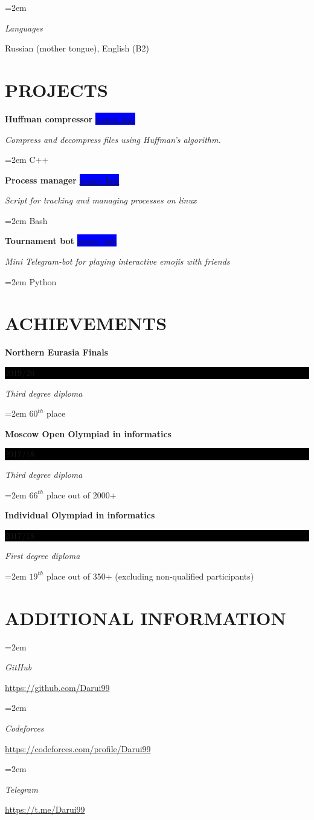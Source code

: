 \documentclass[paper=a4,fontsize=11pt]{scrartcl} %
\newlength{\spacebox}
\newcommand{\sepspace}{\vspace*{1em}}		%
\newcommand{\NewPart}[1]{\section*{\uppercase{#1}}}
\newcommand{\PersonalEntry}[2]{
		\noindent\hangindent=2em\hangafter=0 %
		\parbox{\spacebox}{        %
		\textit{#1}}		       %
		\hspace{1.5em} #2 \par}    %
\newcommand{\SkillsEntry}[2]{      %
		\noindent\hangindent=2em\hangafter=0 %
		\parbox{\spacebox}{        %
		\textit{#1}}			   %
		\hspace{1.5em} #2 \par}    %
\newcommand{\EducationEntry}[4]{
		\noindent \textbf{#1} \hfill      %
		\colorbox{Black}{%
			\parbox{6em}{%
			\hfill\color{White}#2}} \par  %
		\noindent \textit{#3} \par        %
		\noindent\hangindent=2em\hangafter=0 \small #4 %
		\normalsize \par}
\newcommand{\WorkEntry}[4]{				  %
		\noindent \textbf{#1} \hfill      %
		\colorbox{Blue}{\color{White}#2} \par  %
		\noindent \textit{#3} \par              %
		\noindent\hangindent=2em\hangafter=0 \small #4 %
		\normalsize \par}
\begin{document}
\SkillsEntry{Languages}{Russian (mother tongue), English (B2)}
\sepspace

\NewPart{Projects}{}

\WorkEntry{Huffman compressor}{\href{https://github.com/Darui99/ITMO-CPP/tree/master/Huffman}{source link}}{Compress and decompress files using Huffman's algorithm.}{C++}
\sepspace

\WorkEntry{Process manager}{\href{https://github.com/Darui99/ITMO-OS/tree/master/HW4 (alternative)}{source link}}{Script for tracking and managing processes on linux}{Bash}
\sepspace

\WorkEntry{Tournament bot}{\href{https://github.com/Alexvsalexvsalex/telegram-game-bot}{source link}}{Mini Telegram-bot for playing interactive emojis with friends}{Python}
\sepspace

\NewPart{Achievements}{}

\EducationEntry{Northern Eurasia Finals}{2019/20}{Third degree diploma}{$60^{th}$ place}
\sepspace

\EducationEntry{Moscow Open Olympiad in informatics}{2017/18}{Third degree diploma}{$66^{th}$ place out of 2000+}
\sepspace

\EducationEntry{Individual Olympiad in informatics}{2017/18}{First degree diploma}{$19^{th}$ place out of 350+ (excluding non-qualified participants)}
\sepspace

\NewPart{Additional information}{}

\SkillsEntry{GitHub}{\href{https://github.com/Darui99}{https://github.com/Darui99} }
\sepspace

\SkillsEntry{Codeforces}{\href{https://codeforces.com/profile/Darui99}{https://codeforces.com/profile/Darui99} }
\sepspace

\SkillsEntry{Telegram}{\href{https://t.me/Darui99}{https://t.me/Darui99} }
\end{document}
